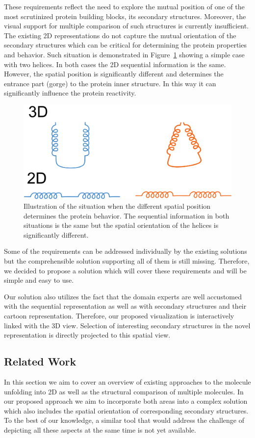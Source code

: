 \documentclass[twocolumn]{bmcart}%
\begin{document}
These requirements reflect the need to explore the mutual position of one of the most scrutinized protein building blocks, its secondary structures.
Moreover, the visual support for multiple comparison of such structures is currently insufficient.
The existing 2D representations do not capture the mutual orientation of the secondary structures which can be critical for determining the protein properties and behavior.
Such situation is demonstrated in Figure~\ref{fig:mutual_pos} showing a simple case with two helices.
In both cases the 2D sequential information is the same.
However, the spatial position is significantly different and determines the entrance part (gorge) to the protein inner structure.
In this way it can significantly influence the protein reactivity.

\begin{figure}[h!]
  \centering
  \includegraphics[width=0.9\columnwidth]{pics/angles.pdf}
  \caption{Illustration of the situation when the different spatial position determines the protein behavior. The sequential information in both situations is the same but the spatial orientation of the helices is significantly different.}
  \label{fig:mutual_pos}
\end{figure}

Some of the requirements can be addressed individually by the existing solutions but the comprehensible solution supporting all of them is still missing.
Therefore, we decided to propose a solution which will cover these requirements and will be simple and easy to use. 

Our solution also utilizes the fact that the domain experts are well accustomed with the sequential representation as well as with secondary structures and their cartoon representation. 
Therefore, our proposed visualization is interactively linked with the 3D view.
Selection of interesting secondary structures in the novel representation is directly projected to this spatial view. 


\subsection*{Related Work}
In this section we aim to cover an overview of existing approaches to the molecule unfolding into 2D as well as the structural comparison of multiple molecules.
In our proposed approach we aim to incorporate both areas into a complex solution which also includes the spatial orientation of corresponding secondary structures.
To the best of our knowledge, a similar tool that would address the challenge of depicting all these aspects at the same time is not yet available. 
\end{document}
